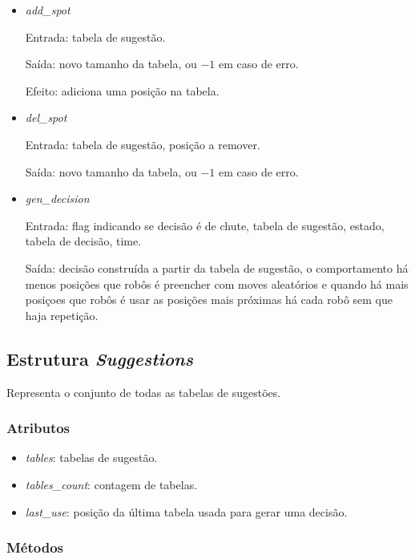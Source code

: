 \begin{itemize}
  \item \textit{add_spot}
    \par Entrada: tabela de sugestão.
    \par Saída: novo tamanho da tabela, ou $-1$ em caso de erro.
    \par Efeito: adiciona uma posição na tabela.
  \item \textit{del_spot}
    \par Entrada: tabela de sugestão, posição a remover.
    \par Saída: novo tamanho da tabela, ou $-1$ em caso de erro.
  \item \textit{gen_decision}
    \par Entrada: flag indicando se decisão é de chute, tabela de sugestão,
    estado, tabela de decisão, time.
    \par Saída: decisão construída a partir da tabela de sugestão, o
    comportamento há menos posições que robôs é preencher com moves aleatórios e
    quando há mais posiçoes que robôs é usar as posições mais próximas há cada
    robô sem que haja repetição.
\end{itemize}

\subsection*{Estrutura \textit{Suggestions}}

Representa o conjunto de todas as tabelas de sugestões.

\subsubsection*{Atributos}

\begin{itemize}
  \item \textit{tables}: tabelas de sugestão.
  \item \textit{tables_count}: contagem de tabelas.
  \item \textit{last_use}: posição da última tabela usada para gerar uma decisão.
\end{itemize}

\subsubsection*{Métodos}

